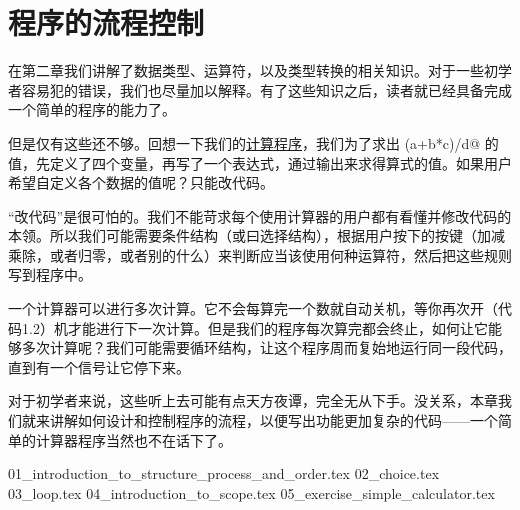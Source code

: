 \chapter{程序的流程控制}
在第二章我们讲解了数据类型、运算符，以及类型转换的相关知识。对于一些初学者容易犯的错误，我们也尽量加以解释。有了这些知识之后，读者就已经具备完成一个简单的程序的能力了。\par
但是仅有这些还不够。回想一下我们的\hyperref[lst:calc1]{计算程序}，我们为了求出 \lstinline@(a+b*c)/d@ 的值，先定义了四个变量，再写了一个表达式，通过输出来求得算式的值。如果用户希望自定义各个数据的值呢？只能改代码。\par
``改代码''是很可怕的。我们不能苛求每个使用计算器的用户都有看懂并修改代码的本领。所以我们可能需要条件结构（或曰选择结构），根据用户按下的按键（加减乘除，或者归零，或者别的什么）来判断应当该使用何种运算符，然后把这些规则写到程序中。\par
一个计算器可以进行多次计算。它不会每算完一个数就自动关机，等你再次开（代码1.2）机才能进行下一次计算。但是我们的程序每次算完都会终止，如何让它能够多次计算呢？我们可能需要循环结构，让这个程序周而复始地运行同一段代码，直到有一个信号让它停下来。\par
对于初学者来说，这些听上去可能有点天方夜谭，完全无从下手。没关系，本章我们就来讲解如何设计和控制程序的流程，以便写出功能更加复杂的代码——一个简单的计算器程序当然也不在话下了。\par
{01_introduction_to_structure_process_and_order.tex}
{02_choice.tex}
{03_loop.tex}
{04_introduction_to_scope.tex}
{05_exercise_simple_calculator.tex}

